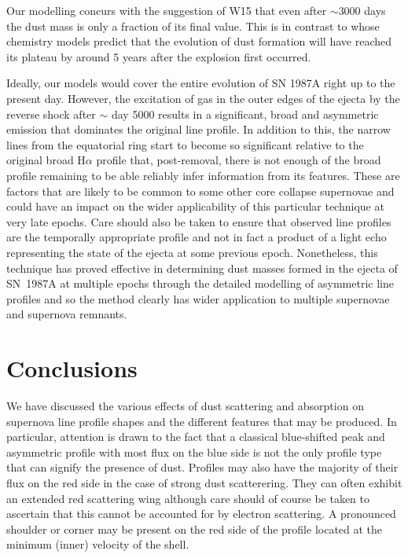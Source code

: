 \documentclass[useAMS,usenatbib,usegraphicx]{mnras}
\begin{document}
Our modelling concurs with the suggestion of W15 that even after 
$\sim$3000 days the dust mass is only a fraction of its final 
value.  This is in contrast to \citet{Sarangi2015} whose chemistry models 
predict that the evolution of dust formation will have reached its plateau 
by around 5 years after the explosion first occurred.

Ideally, our models would cover the entire evolution of SN 1987A right up 
to the present day.  However, the excitation of gas in the outer edges of 
the ejecta by the reverse shock after $\sim$ day 5000 results in a 
significant, broad and asymmetric emission that dominates the original line 
profile.  In addition to this, the narrow lines from the equatorial ring start to 
become so significant relative to the original broad H$\alpha$ profile 
that, post-removal, there is not enough of the broad profile remaining to 
be able reliably infer information from its features.  These are factors 
that are likely to be common to some other core collapse supernovae and could
 have an impact on the wider applicability of this particular 
technique at very late epochs.  Care should also be taken to 
ensure that observed line profiles are the temporally appropriate profile and 
not in fact a product of a light echo representing the state of the ejecta 
at some previous epoch.  Nonetheless, this technique has proved effective 
in determining dust masses formed in the ejecta of SN~1987A at multiple epochs through the 
detailed modelling of asymmetric line profiles and so the method clearly has wider 
application to multiple supernovae and supernova remnants.


\section{Conclusions}

We have discussed the various  effects of 
dust scattering and absorption on supernova line profile shapes and 
the different features that may be produced.  In particular, attention 
is drawn to the fact that a classical blue-shifted peak and 
asymmetric profile with most flux on the blue side is not the 
only profile type that can signify the presence of dust.  Profiles may also have 
the majority of their flux on the red side in the case of strong dust
scatterering.  They can often exhibit an extended red scattering wing 
although care should of course be taken to ascertain that this cannot be 
accounted for by electron scattering. A pronounced 
shoulder or corner may be present on the red side of the profile located 
at the minimum (inner) velocity of the shell.  
\end{document}
